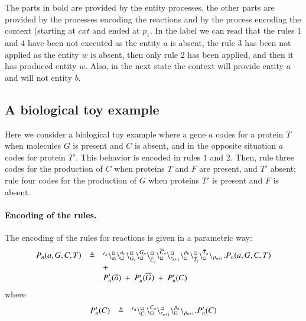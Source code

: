 The parts in bold are provided by the entity processes, the other parts are provided by the processes encoding the reactions and by the process encoding the context (starting at $cxt$ and ended at $p_1$.
In the label we can read that the rules $1$ and $4$ have been not executed as the entity $a$ is absent, 
the rule $3$ has been not applied as the entity $w$ is absent, then only rule $2$ has been applied, and then it has produced entity $w$. Also, in the next state the context will provide entity $a$ and will not entity $b$.

\subsection{A  biological toy example}\label{subsec:toy}


Here we consider a biological toy example where a gene $a$  codes for a protein $T$ when molecules 
$G$ is present and $C$ is absent, and in the opposite situation $a$ codes for protein $T'$.
This behavior is encoded in rules $1$ and $2$.
Then, rule three codes for the production of $C$ when proteins $T$ and $F$ are present, and $T'$ absent;
rule four codes for the production of $G$ when  proteins $T'$ is present and $F$ is absent.
\paragraph{Encoding of the rules.}
The encoding of the rules for reactions is  given in a parametric way:
\[
\begin{array}{lcl}
P_n(a,G,C,T) & \triangleq &{}^{r_n}\backslash_{a_i}^{\scriptstyle {\square}}\backslash_{\scriptstyle {\square}}^{a_o}
                                                    \backslash_{G_i}^{\scriptstyle {\square}}\backslash_{\scriptstyle {\square}}^{G_o}
                                                     \backslash_{\overline{C}_i}^{\scriptstyle {\square}}\backslash_{\scriptstyle {\square}}^{\overline{C}_o}
					        \backslash_{r_{n+1}}^{\scriptstyle {\square}}\backslash_{\scriptstyle {\square}}^{p_n}
					        \backslash_{\tilde{T}_i}^{\scriptstyle {\square}}\backslash_{\scriptstyle {\square}}^{\tilde{T}_o}
			\backslash_{p_{n+1}}.P_n(a,G,C,T)  \\
				&& +\\
			&&P_n'(\overline{a}) \ +\ P_n'(\overline{G}) \ + \ P_n'(C)\\
			\end{array}
			\]
			\noindent
			where
			\[
\begin{array}{lcl}
P_n'(C) &\triangleq &  {}^{r_n}\backslash_{C_i}^{\scriptstyle {\square}}\backslash_{\scriptstyle {\square}}^{C_o}\backslash_{r_{n+1}}^{\scriptstyle {\square}}\backslash_{\scriptstyle {\square}}^{p_n} \backslash_{p_{n+1}}.P_n'(C) 
\end{array}
\]

